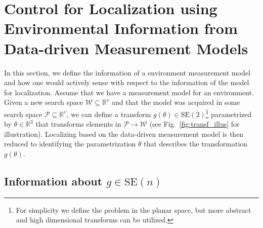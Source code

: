 \documentclass[conference]{IEEEtran}
\begin{document}
\section{Control for Localization using Environmental Information from Data-driven Measurement Models}
\label{sec:shape_localization}

In this section, we define the information of a environment measurement model and how one would actively sense with respect to the information of the model for localization.
Assume that we have a measurement model for an environment.
Given a new search space $\mathcal{W}\subseteq \mathbb{R}^v$ and that the model was acquired in some search space $\mathcal{P}\subseteq \mathbb{R}^v$, we can define a transform $g(\theta) \in \text{SE}(2)$\footnote{For simplicity we define the problem in the planar space, but more abstract and high dimensional transforms can be utilized.} parametrized by $\theta \in \mathbb{R}^3$ that transforms elements in $\mathcal{P}\to \mathcal{W}$ (see Fig.~\ref{fig:transf_illus} for illustration).
Localizing based on the data-driven measurement model is then reduced to identifying the parametrization $\theta$ that describes the transformation $g(\theta)$.

\vspace{-1mm}
\subsection{Information about $g\in \text{SE}(n)$}
\label{sec:eid}
\end{document}
